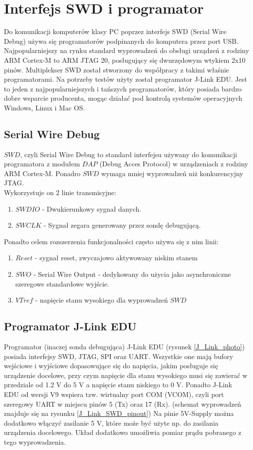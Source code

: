 \chapter {Interfejs SWD i programator}

Do komunikacji komputerów klasy PC poprzez interfejs SWD (Serial Wire Debug) używa się programatorów podpinanych do komputera przez port USB. Najpopularniejszy na rynku standard wyprowadzeń do obsługi urządzeń z rodziny ARM Cortex-M to ARM JTAG 20, posługujący się dwurzędowym wtykiem 2x10 pinów. Multiplekser SWD został stworzony do współpracy z takimi właśnie programatorami. Na potrzeby testów użyty został programator J-Link EDU. Jest to jeden z najpopularniejszych i tańszych programatorów, który posiada bardzo dobre wsparcie producenta, mogąc działać pod kontrolą systemów operacyjnych Windows, Linux i Mac OS.

\section{Serial Wire Debug}
 $SWD$, czyli Serial Wire Debug to standard interfejsu używany do komunikacji programatora z modułem $DAP$ (Debug Acces Protocol) w urządzeniach z rodziny ARM Cortex-M. Ponadro $SWD$ wymaga mniej wyprowadzeń niż konkurencyjny JTAG.\\
 Wykorzystuje on 2 linie transmisyjne:
 \begin{enumerate}
     \item $SWDIO$ - Dwukierunkowy sygnał danych.  
     \item $SWCLK$ - Sygnał zegara generowany przez sondę debugującą.
 \end{enumerate}
 Ponadto celem rozszerzenia funkcjonalności często używa się z nim linii:
 \begin{enumerate}
     \item $Reset$ -  sygnał reset, zwyczajowo aktywowany niskim stanem
     \item $SWO$ - Serial Wire Output - dedykowany do użycia jako asynchroniczne szeregowe standardowe wyjście. 
     \item $VTref$ - napięcie stanu wysokiego dla wyprowadzeń $SWD$
 \end{enumerate}
 
 \section{Programator J-Link EDU}
  Programator (inaczej sonda debugująca) J-Link EDU (rysunek \ref{J_Link_photo}) posiada interfejsy SWD, JTAG, SPI oraz UART. Wszystkie one mają bufory wejściowe i wyjściowe dopasowujące się do napięcia, jakim posługuje się urządzenie docelowe, przy czym napięcie dla stanu wysokiego musi się zawierać w przedziale od 1.2 V do 5 V a napięcie stanu niskiego to 0 V.
  Ponadto J-Link EDU od wersji V9 wspiera tzw. wirtualny port COM (VCOM), czyli port szeregowy UART w miejscu pinów 5 (Tx) oraz 17 (Rx). (schemat wyprowadzeń znajduje się na rysunku \ref{J_Link_SWD_pinout})
  Na pinie 5V-Supply można dodatkowo włączyć zasilanie 5 V, które może być użyte np. do zasilania urządzenia docelowego. Układ dodatkowo umożliwia pomiar prądu pobranego z tego wyprowadzenia.
  
